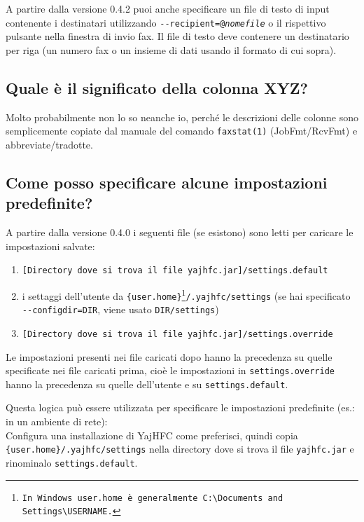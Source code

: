 \documentclass[a4paper,10pt]{scrartcl}
\begin{document}
A partire dalla versione 0.4.2 puoi anche specificare un file di testo di input contenente i destinatari utilizzando \texttt{-{-}recipient=@\textit{nomefile}} o il rispettivo pulsante nella finestra di invio fax.
Il file di testo deve contenere un destinatario per riga (un numero fax o un insieme di dati usando il formato di cui sopra).

\subsection{Quale è il significato della colonna XYZ?}

Molto probabilmente non lo so neanche io, perché le descrizioni delle colonne
sono semplicemente copiate dal manuale del comando \verb.faxstat(1). (JobFmt/RcvFmt) e
abbreviate/tradotte.

\subsection{Come posso specificare alcune impostazioni predefinite?}

A partire dalla versione 0.4.0 i seguenti file (se esistono) sono letti per caricare le impostazioni salvate:
\begin{enumerate}
 \item \texttt{[Directory dove si trova il file yajhfc.jar]/settings.default}
 \item i settaggi dell'utente da \texttt{\{user.home\}\footnote{In Windows \texttt{user.home} è generalmente \texttt{C:\textbackslash Documents and Settings\textbackslash USERNAME}.}/.yajhfc/settings} (se hai specificato \texttt{-{-}configdir=DIR}, viene usato \texttt{DIR/settings})
 \item \texttt{[Directory dove si trova il file yajhfc.jar]/settings.override}
\end{enumerate}

Le impostazioni presenti nei file caricati dopo hanno la precedenza su quelle specificate nei file caricati prima, cioè le impostazioni in \texttt{settings.override} hanno la precedenza su quelle dell'utente e su \texttt{settings.default}.
\medskip

Questa logica può essere utilizzata per specificare le impostazioni predefinite (es.: in un ambiente di rete): \\
Configura una installazione di YajHFC come preferisci, quindi copia \texttt{\{user.home\}/.yajhfc/settings} nella directory dove si trova il file \texttt{yajhfc.jar} e rinominalo \texttt{settings.default}.
\medskip
\end{document}
